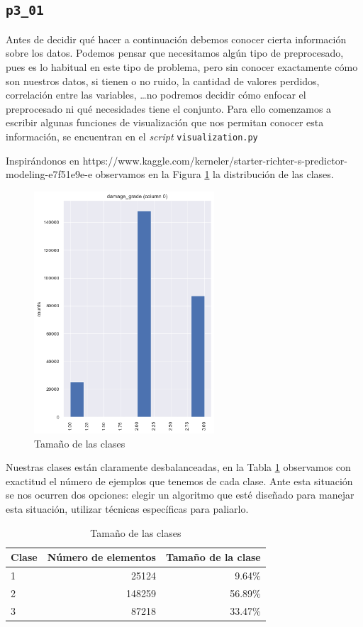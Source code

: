\documentclass[a4paper, 20pt]{article}
\begin{document}
\subsection{\texttt{p3\_01}}

Antes de decidir qué hacer a continuación debemos conocer cierta información sobre los datos. Podemos pensar que necesitamos algún tipo de preprocesado, pues es lo habitual en este tipo de problema, pero sin conocer exactamente cómo son nuestros datos, si tienen o no ruido, la cantidad de valores perdidos, correlación entre las variables, \dots no podremos decidir cómo enfocar el preprocesado ni qué necesidades tiene el conjunto. Para ello comenzamos a escribir algunas funciones de visualización que nos permitan conocer esta información, se encuentran en el \textit{script} \texttt{visualization.py}

Inspirándonos en 
https://www.kaggle.com/kerneler/starter-richter-s-predictor-modeling-e7f51e9e-e
observamos en la Figura \ref{fig:tam_clases} la distribución de las clases.

\begin{figure}[H]
    \centering
    \includegraphics[height=0.6\textwidth, width=0.6\textwidth]{260601_dist}
    \caption{Tamaño de las clases}
    \label{fig:tam_clases}
\end{figure}

Nuestras clases están claramente desbalanceadas, en la Tabla \ref{tab:tam_clas} observamos con exactitud el número de ejemplos que tenemos de cada clase. Ante esta situación se nos ocurren dos opciones: elegir un algoritmo que esté diseñado para manejar esta situación, utilizar técnicas específicas para paliarlo.

\begin{table}[H]
\centering
\caption{Tamaño de las clases}
\label{tab:tam_clas}
\begin{tabular}{lrr}
\toprule
Clase & Número de elementos & Tamaño de la clase\\
\midrule
1 & 25124 & 9.64\%\\
2 & 148259 & 56.89\%\\
3 & 87218 & 33.47\%\\
\bottomrule
\end{tabular}
\end{table}
\end{document}
